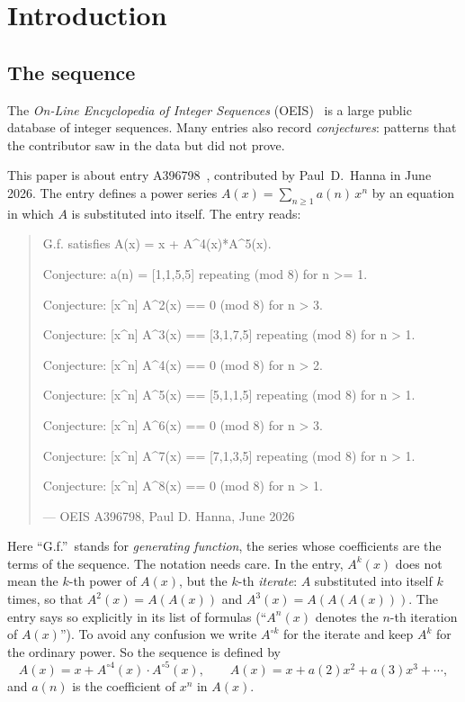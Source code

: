 \documentclass[11pt,a4paper]{article}
\theoremstyle{definition}
\theoremstyle{remark}
\begin{document}
\section{Introduction}

\subsection{The sequence}\label{sec:sequence}
The \emph{On-Line Encyclopedia of Integer Sequences} (OEIS)~\cite{oeisdb} is a large public database of integer
sequences. Many
entries also record \emph{conjectures}: patterns that the contributor saw in the data but did not prove.

This paper is about entry A396798~\cite{oeis}, contributed by Paul~D.~Hanna in June 2026.
The entry defines a power series $A(x)=\sum_{n\ge1}a(n)\,x^n$ by an equation in which $A$ is substituted into
itself. The entry reads:
\begin{quote}\small\ttfamily\raggedright G.f. satisfies A(x) = x + A\^{}4(x)*A\^{}5(x).\par\smallskip Conjecture: a(n) = [1,1,5,5] repeating (mod 8) for n >= 1.\par\smallskip Conjecture: [x\^{}n] A\^{}2(x) == 0 (mod 8) for n > 3.\par\smallskip Conjecture: [x\^{}n] A\^{}3(x) == [3,1,7,5] repeating (mod 8) for n > 1.\par\smallskip Conjecture: [x\^{}n] A\^{}4(x) == 0 (mod 8) for n > 2.\par\smallskip Conjecture: [x\^{}n] A\^{}5(x) == [5,1,1,5] repeating (mod 8) for n > 1.\par\smallskip Conjecture: [x\^{}n] A\^{}6(x) == 0 (mod 8) for n > 3.\par\smallskip Conjecture: [x\^{}n] A\^{}7(x) == [7,1,3,5] repeating (mod 8) for n > 1.\par\smallskip Conjecture: [x\^{}n] A\^{}8(x) == 0 (mod 8) for n > 1.\par\smallskip\hfill\textrm{--- OEIS A396798, Paul D. Hanna, June 2026}\end{quote}

Here ``G.f.''\ stands for \emph{generating function}, the series whose coefficients are the terms of the sequence.
The notation needs care. In the entry, $A^k(x)$ does not mean the $k$-th power of $A(x)$, but the $k$-th
\emph{iterate}: $A$ substituted into itself $k$ times, so that $A^2(x)=A(A(x))$ and $A^3(x)=A(A(A(x)))$. The entry
says so explicitly in its list of formulas (``$A^n(x)$ denotes the $n$-th iteration of $A(x)$''). To avoid any
confusion we write $A^{\circ k}$ for the iterate and keep $A^k$ for the ordinary power. So the sequence is defined by
\begin{equation}\label{eq:def}
A(x)=x+A^{\circ4}(x)\cdot A^{\circ5}(x),\qquad A(x)=x+a(2)x^2+a(3)x^3+\cdots,
\end{equation}
and $a(n)$ is the coefficient of $x^n$ in $A(x)$.
\end{document}
